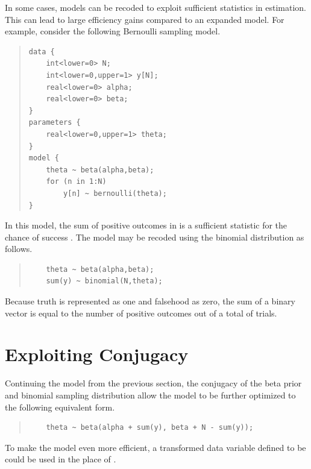 In some cases, models can be recoded to exploit sufficient statistics
in estimation.  This can lead to large efficiency gains compared to an
expanded model.  For example, consider the following Bernoulli
sampling model.
%
\begin{quote}
\begin{Verbatim}
data {
    int<lower=0> N;
    int<lower=0,upper=1> y[N];
    real<lower=0> alpha;
    real<lower=0> beta;
}
parameters {
    real<lower=0,upper=1> theta;
}
model {
    theta ~ beta(alpha,beta);
    for (n in 1:N) 
        y[n] ~ bernoulli(theta);
}
\end{Verbatim}
\end{quote}
%
In this model, the sum of positive outcomes in  is a
sufficient statistic for the chance of success .  The
model may be recoded using the binomial distribution as follows.
%
\begin{quote}
\begin{Verbatim}
    theta ~ beta(alpha,beta);
    sum(y) ~ binomial(N,theta);
\end{Verbatim}
\end{quote}
%
Because truth is represented as one and falsehood as zero, the sum
 of a binary vector  is equal to the number of
positive outcomes out of a total of  trials.  



\section{Exploiting Conjugacy}


Continuing the model from the previous section, the conjugacy of the
beta prior and binomial sampling distribution allow the model to be
further optimized to the following equivalent form.
%
\begin{quote}
\begin{Verbatim}
    theta ~ beta(alpha + sum(y), beta + N - sum(y));
\end{Verbatim}
\end{quote}
%
To make the model even more efficient, a transformed data variable
defined to be  could be used in the place of .



